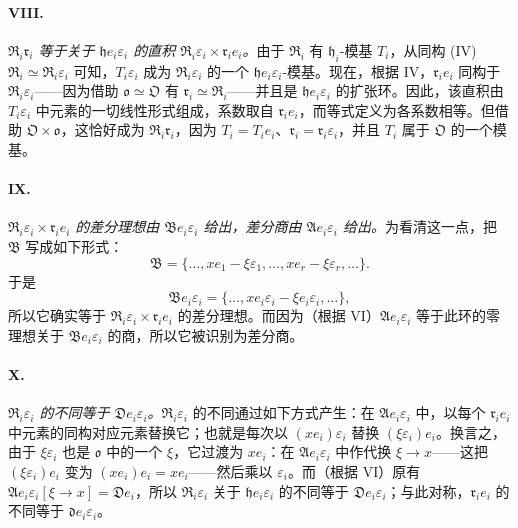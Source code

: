 \paragraph{VIII.}
\emph{$\mathfrak R_i\mathfrak r_i$ 等于关于 $\mathfrak h e_i\varepsilon_i$ 的直积 $\mathfrak R_i\varepsilon_i\times\mathfrak r_i e_i$。}由于 $\mathfrak R_i$ 有 $\mathfrak h_i$-模基 $T_i$，从同构 (IV) $\mathfrak R_i\simeq\mathfrak R_i\varepsilon_i$ 可知，$T_i\varepsilon_i$ 成为 $\mathfrak R_i\varepsilon_i$ 的一个 $\mathfrak h e_i\varepsilon_i$-模基。现在，根据 IV，$\mathfrak r_i e_i$ 同构于 $\mathfrak R_i\varepsilon_i$——因为借助 $\mathfrak o\simeq\mathfrak O$ 有 $\mathfrak r_i\simeq\mathfrak R_i$——并且是 $\mathfrak h e_i\varepsilon_i$ 的扩张环。因此，该直积由 $T_i\varepsilon_i$ 中元素的一切线性形式组成，系数取自 $\mathfrak r_i e_i$，而等式定义为各系数相等。但借助 $\mathfrak O\times\mathfrak o$，这恰好成为 $\mathfrak R_i\mathfrak r_i$，因为 $T_i=T_i e_i$、$\mathfrak r_i=\mathfrak r_i\varepsilon_i$，并且 $T_i$ 属于 $\mathfrak O$ 的一个模基。

\paragraph{IX.}
\emph{$\mathfrak R_i\varepsilon_i\times\mathfrak r_i e_i$ 的差分理想由 $\mathfrak B e_i\varepsilon_i$ 给出，差分商由 $\mathfrak A e_i\varepsilon_i$ 给出。}为看清这一点，把 $\mathfrak B$ 写成如下形式：
\[
\mathfrak B=\{\ldots,xe_1-\xi\varepsilon_1,\ldots,xe_r-\xi\varepsilon_r,\ldots\}.
\]
于是
\[
\mathfrak B e_i\varepsilon_i
=\{\ldots,xe_i\varepsilon_i-\xi e_i\varepsilon_i,\ldots\},
\]
所以它确实等于 $\mathfrak R_i\varepsilon_i\times\mathfrak r_i e_i$ 的差分理想。而因为（根据 VI）$\mathfrak A e_i\varepsilon_i$ 等于此环的零理想关于 $\mathfrak B e_i\varepsilon_i$ 的商，所以它被识别为差分商。

\paragraph{X.}
\emph{$\mathfrak R_i\varepsilon_i$ 的不同等于 $\mathfrak D e_i\varepsilon_i$。}$\mathfrak R_i\varepsilon_i$ 的不同通过如下方式产生：在 $\mathfrak A e_i\varepsilon_i$ 中，以每个 $\mathfrak r_i e_i$ 中元素的同构对应元素替换它；也就是每次以 $(xe_i)\varepsilon_i$ 替换 $(\xi\varepsilon_i)e_i$。换言之，由于 $\xi\varepsilon_i$ 也是 $\mathfrak o$ 中的一个 $\xi$，它过渡为 $xe_i$：在 $\mathfrak A e_i\varepsilon_i$ 中作代换 $\xi\to x$——这把 $(\xi\varepsilon_i)e_i$ 变为 $(xe_i)e_i=xe_i$——然后乘以 $\varepsilon_i$。而（根据 VI）原有 $\mathfrak A e_i\varepsilon_i[\xi\to x]=\mathfrak D e_i$，所以 $\mathfrak R_i\varepsilon_i$ 关于 $\mathfrak h e_i\varepsilon_i$ 的不同等于 $\mathfrak D e_i\varepsilon_i$；与此对称，$\mathfrak r_i e_i$ 的不同等于 $\mathfrak d e_i\varepsilon_i$。

